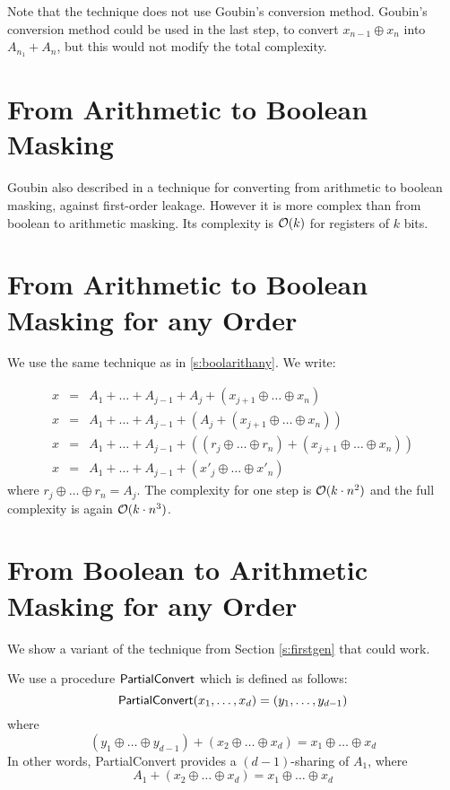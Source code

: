 \documentclass[11pt]{llncs}
\begin{document}
Note that the technique does not use Goubin's conversion
method. Goubin's conversion method could be used in the last step, to
convert $x_{n-1} \oplus x_n$ into $A_{n_1}+ A_n$, but this would not
modify the total complexity. 

\section{From Arithmetic to Boolean Masking}

Goubin also described in \cite{goubin} a technique for converting from
arithmetic to boolean masking, against first-order leakage. However it
is more complex than from boolean to arithmetic masking. Its
complexity is ${\cal O}(k)$ for registers of $k$ bits.

\section{From Arithmetic to Boolean Masking for any Order}

We use the same technique as in \ref{s:boolarithany}. We write:

\begin{eqnarray*}
x & = & A_1 + \ldots +A_{j-1}+ A_j + (x_{j+1} \oplus \ldots \oplus x_n)\\
x & = & A_1 + \ldots +A_{j-1} + \left( A_j + (x_{j+1} \oplus \ldots
\oplus x_n) \right) \\
x & = & A_1 + \ldots +A_{j-1} + \left( (r_{j} \oplus \ldots \oplus
r_n) + (x_{j+1} \oplus \ldots
\oplus x_n) \right) \\
x & = & A_1 + \ldots + A_{j-1} +  \left( x'_{j} \oplus \ldots \oplus
x'_n \right)
\end{eqnarray*}
where $r_{j} \oplus \ldots \oplus r_n=A_j$. The complexity for one
step is ${\cal O}(k \cdot n^2)$ and the full complexity is again
${\cal O}(k \cdot n^3)$. 

\section{From Boolean to Arithmetic Masking for any Order}

We show a variant of the technique from Section \ref{s:firstgen} that
could work.

We use a procedure ${\sf PartialConvert}$ which is defined as follows:
$${\sf PartialConvert}(x_1,\ldots,x_d)=(y_1,\ldots,y_{d-1})$$
where
$$ (y_1 \oplus \ldots \oplus y_{d-1}) + (x_2 \oplus \ldots \oplus
x_d)=x_1 \oplus \ldots \oplus x_d$$
In other words, {\sf PartialConvert} provides a $(d-1)$-sharing of
$A_1$, where 
$$A_1 +  (x_2 \oplus \ldots \oplus
x_d)=x_1 \oplus \ldots \oplus x_d$$
\end{document}
